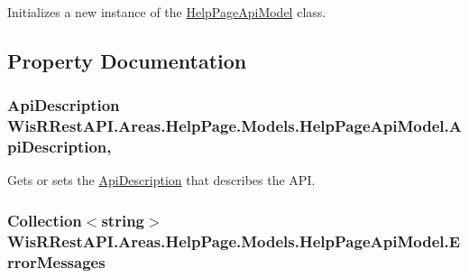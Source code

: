 Initializes a new instance of the \hyperlink{class_wis_r_rest_a_p_i_1_1_areas_1_1_help_page_1_1_models_1_1_help_page_api_model}{Help\+Page\+Api\+Model} class. 



\subsection{Property Documentation}
\hypertarget{class_wis_r_rest_a_p_i_1_1_areas_1_1_help_page_1_1_models_1_1_help_page_api_model_a40fa47cb8964daa794f040d88a9872fd}{}
\subsubsection[{Api\+Description}]{\setlength{\rightskip}{0pt plus 5cm}Api\+Description Wis\+R\+Rest\+A\+P\+I.\+Areas.\+Help\+Page.\+Models.\+Help\+Page\+Api\+Model.\+Api\+Description\hspace{0.3cm}{\ttfamily [get]}, {\ttfamily [set]}}\label{class_wis_r_rest_a_p_i_1_1_areas_1_1_help_page_1_1_models_1_1_help_page_api_model_a40fa47cb8964daa794f040d88a9872fd}


Gets or sets the \hyperlink{class_wis_r_rest_a_p_i_1_1_areas_1_1_help_page_1_1_models_1_1_help_page_api_model_a40fa47cb8964daa794f040d88a9872fd}{Api\+Description} that describes the A\+P\+I. 

\hypertarget{class_wis_r_rest_a_p_i_1_1_areas_1_1_help_page_1_1_models_1_1_help_page_api_model_a300819ba546f941d4c34b29d12418435}{}
\subsubsection[{Error\+Messages}]{\setlength{\rightskip}{0pt plus 5cm}Collection$<$string$>$ Wis\+R\+Rest\+A\+P\+I.\+Areas.\+Help\+Page.\+Models.\+Help\+Page\+Api\+Model.\+Error\+Messages\hspace{0.3cm}{\ttfamily [get]}}\label{class_wis_r_rest_a_p_i_1_1_areas_1_1_help_page_1_1_models_1_1_help_page_api_model_a300819ba546f941d4c34b29d12418435}


